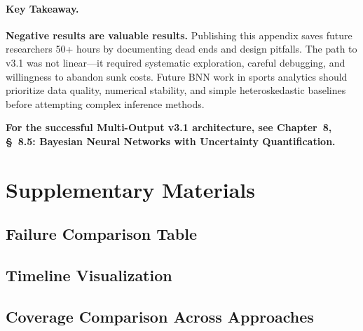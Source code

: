 \paragraph{Key Takeaway.}
\textbf{Negative results are valuable results.} Publishing this appendix saves future researchers 50+ hours by documenting dead ends and design pitfalls. The path to v3.1 was not linear—it required systematic exploration, careful debugging, and willingness to abandon sunk costs. Future BNN work in sports analytics should prioritize data quality, numerical stability, and simple heteroskedastic baselines before attempting complex inference methods.

\textbf{For the successful Multi-Output v3.1 architecture, see Chapter~8, \S~8.5: Bayesian Neural Networks with Uncertainty Quantification.}

\section{Supplementary Materials}

\subsection{Failure Comparison Table}


\subsection{Timeline Visualization}


\subsection{Coverage Comparison Across Approaches}


